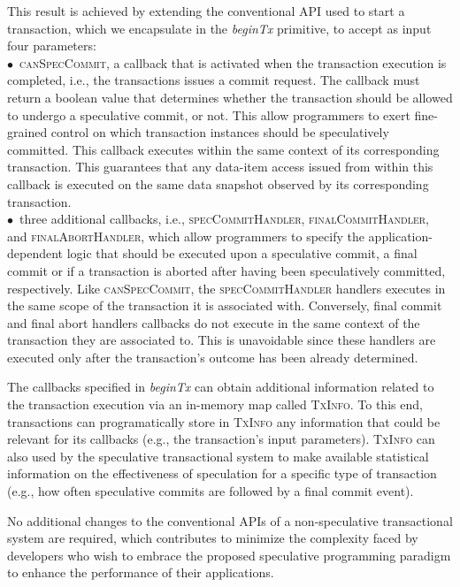 This result is achieved by extending the conventional API used to start a transaction, which we encapsulate in the \textit{beginTx} primitive, to accept as input four parameters:\\
\noindent $\bullet$~\textsc{canSpecCommit}, a callback that is activated when the transaction execution is completed, i.e., the transactions issues a commit request. The callback must return a boolean value that determines whether the transaction should be allowed to undergo a speculative commit, or not. This allow programmers to exert fine-grained control on which transaction instances should be speculatively committed.  This callback executes within the same context of its corresponding transaction. This guarantees that any data-item access issued from within this callback is executed on the same data snapshot observed by its corresponding transaction. \\
\noindent $\bullet$~three additional callbacks, i.e., \textsc{specCommitHandler}, \textsc{finalCommitHandler}, and \textsc{finalAbortHandler},  which allow  programmers to specify the application-dependent logic that should be executed upon a speculative commit, a final commit or if a transaction is aborted after having been speculatively committed, respectively. Like \textsc{canSpecCommit}, the \textsc{specCommitHandler} handlers executes in the same  scope of the transaction it is associated with. Conversely, final commit and final abort handlers callbacks do not execute in the same context of the transaction they are associated to. This is unavoidable since these handlers are executed only after the transaction's outcome has been already determined. 




 

The callbacks specified in \textit{beginTx} can obtain additional information related to the transaction execution via  an in-memory map called \textsc{TxInfo}. To this end, transactions can programatically store in \textsc{TxInfo}  any information that could be relevant for its callbacks (e.g., the transaction's input parameters). \textsc{TxInfo} can also used by the speculative transactional system to make available statistical information on the effectiveness of speculation for a specific type of transaction (e.g., how often speculative commits are followed by a final commit event).


No additional changes to the conventional APIs of a non-speculative transactional system are required, which contributes to minimize the complexity faced by developers who wish to embrace the proposed speculative programming paradigm to enhance the performance of their applications. 




